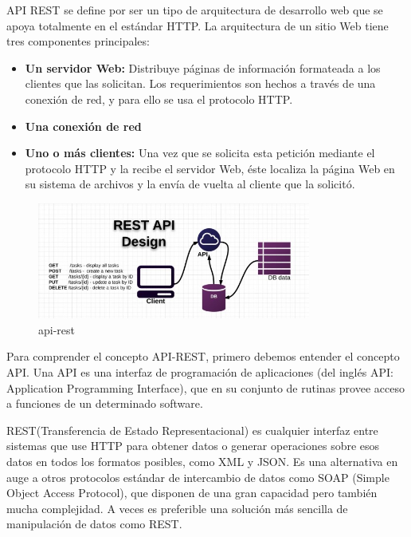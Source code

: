 API REST se define por ser un tipo de arquitectura de desarrollo web que se apoya totalmente en el estándar HTTP.
La arquitectura de un sitio Web tiene tres componentes principales:
\begin{itemize}
    \item \textbf {Un servidor Web:} Distribuye páginas de información formateada a los clientes que las solicitan. Los requerimientos son hechos a través de una conexión de red, y para ello se usa el protocolo HTTP.
    \item \textbf {Una conexión de red}
    \item \textbf {Uno o más clientes:} Una vez que se solicita esta petición mediante el protocolo HTTP y la recibe el servidor Web, éste localiza la página Web en su sistema de archivos y la envía de vuelta al cliente que la solicitó.
\end{itemize}
\begin{figure}[!h]
\centering
\includegraphics[width=90mm]{img/introduccion/rest-api.jpg}
\caption{api-rest}
\end{figure}

Para comprender el concepto API-REST, primero debemos entender el concepto API. Una API es una interfaz de programación de aplicaciones (del inglés API: Application Programming Interface), que en su conjunto de rutinas provee acceso a funciones de un determinado software.

REST(Transferencia de Estado Representacional) es cualquier interfaz entre sistemas que use HTTP para obtener datos o generar operaciones sobre esos datos en todos los formatos posibles, como XML y JSON. Es una alternativa en auge a otros protocolos estándar de intercambio de datos como SOAP (Simple Object Access Protocol), que disponen de una gran capacidad pero también mucha complejidad. A veces es preferible una solución más sencilla de manipulación de datos como REST.

